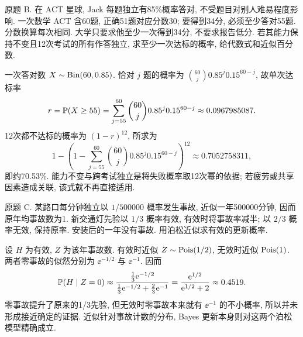 \begin{exercise}\label{ps4-b}
原题 B. 在 ACT 星球, Jack 每题独立有85\%概率答对, 不受题目对别人难易程度影响. 一次数学 ACT 含60题, 正确51题对应分数30; 要得到34分, 必须至少答对55题. 分数换算每次相同. 大学只要求他至少一次得到34分, 不要求报告低分. 若其能力保持不变且12次考试的所有作答独立, 求至少一次达标的概率, 给代数式和近似百分数.
\end{exercise}
\begin{solution}
一次答对数 $X\sim\operatorname{Bin}(60,0.85)$. 恰对 $j$ 题的概率为 $\binom{60}{j}0.85^j0.15^{60-j}$, 故单次达标率
\[
r=\mathbb P(X\ge55)=\sum_{j=55}^{60}\binom{60}{j}0.85^j0.15^{60-j}\approx0.0967985087.
\]
12次都不达标的概率为 $(1-r)^{12}$, 所求为
\[
1-\left(1-\sum_{j=55}^{60}\binom{60}{j}0.85^j0.15^{60-j}\right)^{12}
\approx0.7052758311,
\]
即约70.53\%. 能力不变与跨考试独立是将失败概率取12次幂的依据; 若疲劳或共享因素造成关联, 该式就不再直接适用.
\end{solution}

\begin{exercise}\label{ps4-c}
原题 C. 某路口每分钟独立以 $1/500000$ 概率发生事故, 近似一年500000分钟, 因而原年均事故数为1. 新交通灯先验以 $1/3$ 概率有效, 有效时将事故率减半; 以 $2/3$ 概率无效, 保持原率. 安装后的一年没有事故. 用泊松近似求有效的更新概率.
\end{exercise}
\begin{solution}
设 $H$ 为有效, $Z$ 为该年事故数. 有效时近似 $Z\sim\operatorname{Pois}(1/2)$, 无效时近似 $\operatorname{Pois}(1)$. 两者零事故的似然分别为 $\ee^{-1/2}$ 与 $\ee^{-1}$. 因而
\[
\mathbb P(H\mid Z=0)\approx
\frac{\tfrac13\mathrm e^{-1/2}}{\tfrac13\mathrm e^{-1/2}+\tfrac23\mathrm e^{-1}}
=\frac{\mathrm e^{1/2}}{\mathrm e^{1/2}+2}\approx0.4519.
\]
零事故提升了原来的1/3先验, 但无效时零事故本来就有 $\ee^{-1}$ 的不小概率, 所以并未形成接近确定的证据. 近似针对事故计数的分布, Bayes 更新本身则对这两个泊松模型精确成立.
\end{solution}

